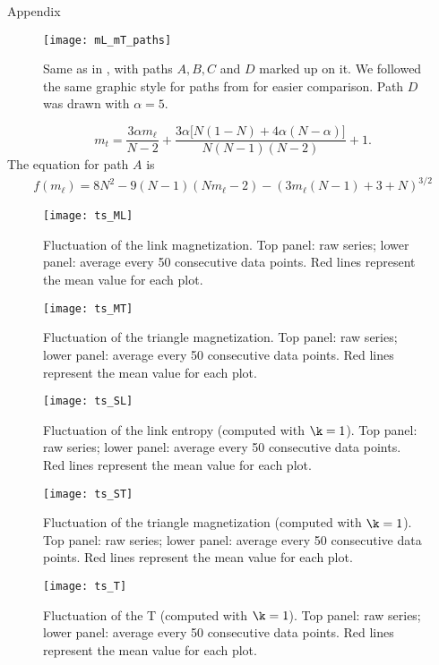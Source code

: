 \begin{frame}[allowframebreaks]{Appendix}
\framebreak
\begin{figure}
    \centering
    \texttt{[image: mL\_mT\_paths]}
    \caption{Same as in , with paths $A,B,C$ and $D$ marked up on it. We followed the same graphic style for paths from  for easier comparison. Path $D$ was drawn with $\alpha=5$.\label{fig:mL_mT_paths}}
\end{figure}
\framebreak
\begin{equation}
    m_{t} =  \frac{3 \alpha m_{\ell}}{N - 2} + \frac{3\alpha\big[N(1-N)+4\alpha(N-\alpha)\big]}{N(N-1)(N-2)} + 1.
\label{eq:mT_of_mL}
\end{equation}
The equation for path $A$ is
\begin{equation}
    \begin{split}
        f(m_\ell) = 8N^2 - 9(N-1)(Nm_\ell -2)- (3m_\ell(N-1) + 3+N)^{3 / 2}
    \end{split}
    \label{eq:rs}
\end{equation}
\framebreak
\begin{figure}[h]
    \centering
	\texttt{[image: ts\_ML]}
    \caption{Fluctuation of the link magnetization. Top panel: raw series; lower panel: average every 50 consecutive data points. Red lines represent the mean value for each plot.}
    \label{fig:ts1}
\end{figure}
\framebreak
\begin{figure}[h]
    \centering
    \texttt{[image: ts\_MT]}
    \caption{Fluctuation of the triangle magnetization. Top panel: raw series; lower panel: average every 50 consecutive data points. Red lines represent the mean value for each plot.}
    \label{fig:ts2}
\end{figure}
\framebreak
\begin{figure}[h]
    \centering
    \texttt{[image: ts\_SL]}
    \caption{Fluctuation of the link entropy (computed with $\k=1$). Top panel: raw series; lower panel: average every 50 consecutive data points. Red lines represent the mean value for each plot.}
    \label{fig:ts3}
\end{figure}
\framebreak
\begin{figure}[h]
    \centering
    \texttt{[image: ts\_ST]}
    \caption{Fluctuation of the triangle magnetization (computed with $\k=1$). Top panel: raw series; lower panel: average every 50 consecutive data points. Red lines represent the mean value for each plot.}
    \label{fig:ts4}
\end{figure}
\framebreak
\begin{figure}[h]
    \centering
    \texttt{[image: ts\_T]}
    \caption{Fluctuation of the T (computed with $\k=1$). Top panel: raw series; lower panel: average every 50 consecutive data points. Red lines represent the mean value for each plot.}
    \label{fig:ts5}
\end{figure}

\end{frame}



